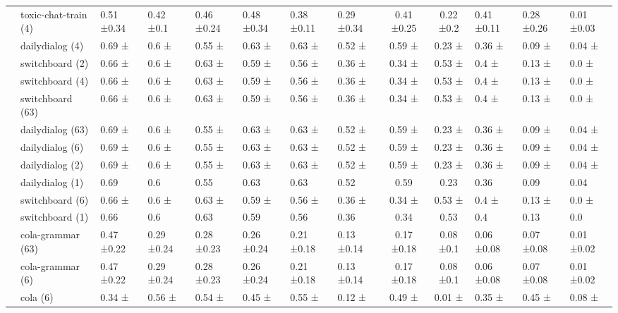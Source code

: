 \begin{tabular}{llllllll|cc}
 & toxic-chat-train (4) & 0.51 ±0.34 & 0.42 ±0.1 & 0.46 ±0.24 & 0.48 ±0.34 & 0.38 ±0.11 & 0.29 ±0.34 & 0.41 ±0.25 & 0.22 ±0.2 & 0.41 ±0.11 & 0.28 ±0.26 & 0.01 ±0.03 \\
 & dailydialog (4) & 0.69 ± & 0.6 ± & 0.55 ± & 0.63 ± & 0.63 ± & 0.52 ± & 0.59 ± & 0.23 ± & 0.36 ± & 0.09 ± & 0.04 ± \\
 & switchboard (2) & 0.66 ± & 0.6 ± & 0.63 ± & 0.59 ± & 0.56 ± & 0.36 ± & 0.34 ± & 0.53 ± & 0.4 ± & 0.13 ± & 0.0 ± \\
 & switchboard (4) & 0.66 ± & 0.6 ± & 0.63 ± & 0.59 ± & 0.56 ± & 0.36 ± & 0.34 ± & 0.53 ± & 0.4 ± & 0.13 ± & 0.0 ± \\
 & switchboard (63) & 0.66 ± & 0.6 ± & 0.63 ± & 0.59 ± & 0.56 ± & 0.36 ± & 0.34 ± & 0.53 ± & 0.4 ± & 0.13 ± & 0.0 ± \\
 & dailydialog (63) & 0.69 ± & 0.6 ± & 0.55 ± & 0.63 ± & 0.63 ± & 0.52 ± & 0.59 ± & 0.23 ± & 0.36 ± & 0.09 ± & 0.04 ± \\
 & dailydialog (6) & 0.69 ± & 0.6 ± & 0.55 ± & 0.63 ± & 0.63 ± & 0.52 ± & 0.59 ± & 0.23 ± & 0.36 ± & 0.09 ± & 0.04 ± \\
 & dailydialog (2) & 0.69 ± & 0.6 ± & 0.55 ± & 0.63 ± & 0.63 ± & 0.52 ± & 0.59 ± & 0.23 ± & 0.36 ± & 0.09 ± & 0.04 ± \\
 & dailydialog (1) & 0.69  & 0.6  & 0.55  & 0.63  & 0.63  & 0.52  & 0.59  & 0.23  & 0.36  & 0.09  & 0.04  \\
 & switchboard (6) & 0.66 ± & 0.6 ± & 0.63 ± & 0.59 ± & 0.56 ± & 0.36 ± & 0.34 ± & 0.53 ± & 0.4 ± & 0.13 ± & 0.0 ± \\
 & switchboard (1) & 0.66  & 0.6  & 0.63  & 0.59  & 0.56  & 0.36  & 0.34  & 0.53  & 0.4  & 0.13  & 0.0  \\
 & cola-grammar (63) & 0.47 ±0.22 & 0.29 ±0.24 & 0.28 ±0.23 & 0.26 ±0.24 & 0.21 ±0.18 & 0.13 ±0.14 & 0.17 ±0.18 & 0.08 ±0.1 & 0.06 ±0.08 & 0.07 ±0.08 & 0.01 ±0.02 \\
 & cola-grammar (6) & 0.47 ±0.22 & 0.29 ±0.24 & 0.28 ±0.23 & 0.26 ±0.24 & 0.21 ±0.18 & 0.13 ±0.14 & 0.17 ±0.18 & 0.08 ±0.1 & 0.06 ±0.08 & 0.07 ±0.08 & 0.01 ±0.02 \\
 & cola (6) & 0.34 ± & 0.56 ± & 0.54 ± & 0.45 ± & 0.55 ± & 0.12 ± & 0.49 ± & 0.01 ± & 0.35 ± & 0.45 ± & 0.08 ± \\

\end{tabular}
